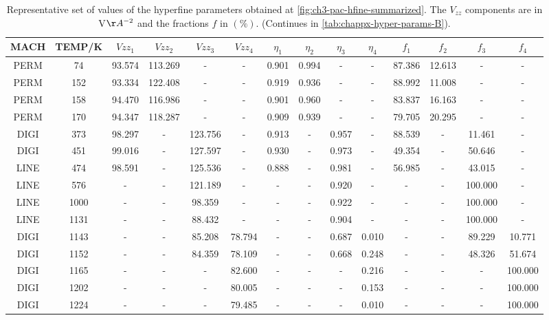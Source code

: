 \begin{sidewaystable}
\centering
\begin{tabular}{cccccccccccccc}
\toprule
    MACH &  TEMP/K &  $Vzz_1$ &   $Vzz_2$ &   $Vzz_3$ &  $Vzz_4$  & $\eta_1$ &  $\eta_2$ &  $\eta_3$ &  $\eta_4$ &  $f_1$ &    $f_2$ &     $f_3$ &     $f_4$\\
\midrule
PERM &      74 & 93.574 & 113.269 &     - &    -    &  0.901 &  0.994 &    - &    - &  87.386 & 12.613 &     - &     -\\
PERM &     152 & 93.334 & 122.408 &     - &    -    &  0.919 &  0.936 &    - &    - &  88.992 & 11.008 &     - &     -\\
PERM &     158 & 94.470 & 116.986 &     - &    -    &  0.901 &  0.960 &    - &    - &  83.837 & 16.163 &     - &     -\\
PERM &     170 & 94.347 & 118.287 &     - &    -    &  0.909 &  0.939 &    - &    - &  79.705 & 20.295 &     - &     -\\
DIGI &     373 & 98.297 &     - & 123.756 &    -    &  0.913 &    - &  0.957 &    - &  88.539 &    - &  11.461 &     -\\
DIGI &     451 & 99.016 &     - & 127.597 &    -    &  0.930 &    - &  0.973 &    - &  49.354 &    - &  50.646 &     -\\
LINE &     474 & 98.591 &     - & 125.536 &    -    &  0.888 &    - &  0.981 &    - &  56.985 &    - &  43.015 &     -\\
LINE &     576 &    - &     - & 121.189 &    -    &    - &    - &  0.920 &    - &     - &    - & 100.000 &     -\\
LINE &    1000 &    - &     - &  98.359 &    -    &    - &    - &  0.922 &    - &     - &    - & 100.000 &     -\\
LINE &    1131 &    - &     - &  88.432 &    -    &    - &    - &  0.904 &    - &     - &    - & 100.000 &     -\\
DIGI &    1143 &    - &     - &  85.208 & 78.794    &    - &    - &  0.687 &  0.010 &     - &    - &  89.229 &  10.771\\
DIGI &    1152 &    - &     - &  84.359 & 78.109    &    - &    - &  0.668 &  0.248 &     - &    - &  48.326 &  51.674\\
DIGI &    1165 &    - &     - &     - & 82.600    &    - &    - &    - &  0.216 &     - &    - &     - & 100.000\\
DIGI &    1202 &    - &     - &     - & 80.005    &    - &    - &    - &  0.153 &     - &    - &     - & 100.000\\
DIGI &    1224 &    - &     - &     - & 79.485    &    - &    - &    - &  0.010 &     - &    - &     - & 100.000\\
\bottomrule
\end{tabular}
\caption{Representative set of values of the hyperfine parameters obtained at \cref{fig:ch3-pac-hfine-summarized}. The $V_{zz}$ components are in V$\AA^{-2}$ and the fractions $f$ in $(\%)$. (Continues in \cref{tab:chappx-hyper-params-B}).}
\label{tab:chappx-hyper-params-A}
\end{sidewaystable}

